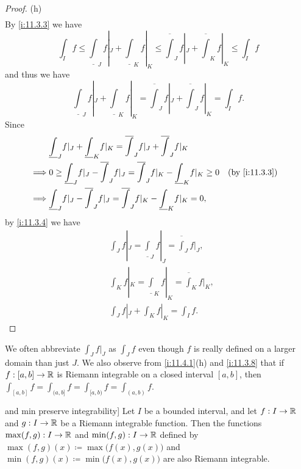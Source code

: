 \begin{proof}{(h)}
\begin{align*}
  \end{align*}
  By \cref{i:11.3.3} we have
  \[
    \int_I f \leq \underline{\int}_J f|_J + \underline{\int}_K f|_K \leq \overline{\int}_J f|_J + \overline{\int}_K f|_K \leq \int_I f
  \]
  and thus we have
  \[
    \underline{\int}_J f|_J + \underline{\int}_K f|_K = \overline{\int}_J f|_J + \overline{\int}_J f|_K = \int_I f.
  \]
  Since
  \begin{align*}
             & \underline{\int}_J f|_J + \underline{\int}_K f|_K = \overline{\int}_J f|_J + \overline{\int}_J f|_K                                  \\
    \implies & 0 \geq \underline{\int}_J f|_J - \overline{\int}_J f|_J = \overline{\int}_J f|_K - \underline{\int}_K f|_K \geq 0 &  & \by{i:11.3.3} \\
    \implies & \underline{\int}_J f|_J - \overline{\int}_J f|_J = \overline{\int}_J f|_K - \underline{\int}_K f|_K = 0,
  \end{align*}
  by \cref{i:11.3.4} we have
  \begin{align*}
     & \int_J f|_J = \underline{\int}_J f|_J = \overline{\int}_J f|_J, \\
     & \int_K f|_K = \underline{\int}_K f|_K = \overline{\int}_K f|_K, \\
     & \int_J f|_J + \int_K f|_K = \int_I f.
  \end{align*}
\end{proof}

\begin{rmk}\label{i:11.4.2}
  We often abbreviate \(\int_J f|_J\) as \(\int_J f\) even though \(f\) is really defined on a larger domain than just \(J\).
  We also observe from \cref{i:11.4.1}(h) and \cref{i:11.3.8} that if \(f : [a, b] \to \mathbb{R}\) is Riemann integrable on a closed interval \([a, b]\), then \(\int_{[a, b]} f = \int_{(a, b]} f = \int_{[a, b)} f = \int_{(a, b)} f\).
\end{rmk}

\begin{thm} and min preserve integrability]\label{i:11.4.3}
  Let \(I\) be a bounded interval, and let \(f : I \to \mathbb{R}\) and \(g : I \to \mathbb{R}\) be a Riemann integrable function.
  Then the functions \(\max(f, g) : I \to \mathbb{R}\) and \(\min(f, g) : I \to \mathbb{R}\) defined by \(\max(f, g)(x) \coloneqq \max\big(f(x), g(x)\big)\) and \(\min(f, g)(x) \coloneqq \min\big(f(x), g(x)\big)\) are also Riemann integrable.
\end{thm}

